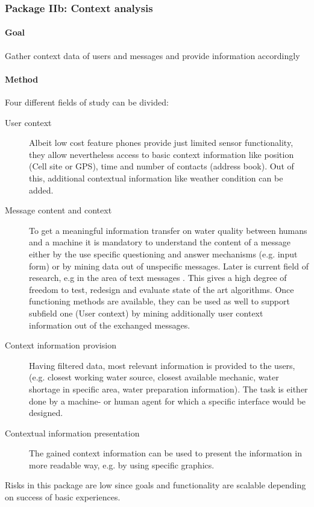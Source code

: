 \documentclass[11pt]{article}
\begin{document}
\subsubsection*{Package IIb: Context analysis}
\paragraph{Goal} Gather context data of users and messages and provide information accordingly

\paragraph{Method}
Four different fields of study can be divided:
\begin{description}
 \item [User context] Albeit low cost feature phones provide just limited sensor functionality, they allow nevertheless access to basic context information like position (Cell site or GPS), time and number of contacts (address book). Out of this, additional contextual information like weather condition can be added.
 \item [Message content and context] To get a meaningful information transfer on water quality between humans and a machine it is mandatory to understand the content of a message either by the use specific questioning and answer mechanisms (e.g. input form) or by mining data out of unspecific messages. Later is current field of research, e.g in the area of text messages \cite{aggarwal2012mining}. This gives a high degree of freedom to test, redesign and evaluate state of the art algorithms. Once functioning methods are available, they can be used as well to support subfield one (User context) by mining additionally user context information out of the exchanged messages. 
 \item [Context information provision] Having filtered data, most relevant information is provided to the users, (e.g. closest working water source, closest available mechanic, water shortage in specific area, water preparation information). The task is either done by a machine- or human agent for which a specific interface would be designed.
 \item [Contextual information presentation] The gained context information can be used to present the information in more readable way, e.g. by using specific graphics.
\end{description}

Risks in this package are low since goals and functionality are scalable depending on success of basic experiences.
\end{document}
